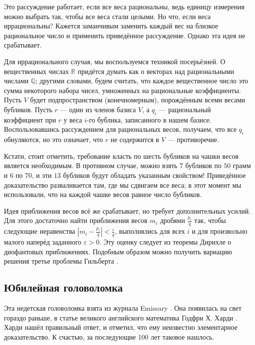 Это рассуждение работает, если все веса рациональны, ведь единицу измерения можно выбрать так, чтобы все веса стали целыми.
Но что, если веса иррациональны?
Кажется заманчивым заменить каждый вес на близкое рациональное число и применить приведённое рассуждение.
Однако эта идея не срабатывает.

Для иррационального случая, мы воспользуемся техникой посерьёзней.
О вещественных числах $\mathbb{R}$ придётся думать как о векторах над рациональными числами $\mathbb{Q}$;
другими словами, будем считать, что каждое вещественное число это сумма некоторого набора чисел, умноженных на рациональные коэффициенты.
Пусть $V$ будет подпространством (конечномерным), порождённым всеми весами бубликов.
Пусть $r$ --- один из членов базиса $V$, а $q_i$ --- рациональный коэффициент при $r$ у веса $i$-го бублика, записанного в нашем базисе.
Воспользовавшись рассуждением для рациональных весов, получаем, что все $q_i$ обнуляются, но это означает, что $r$ не содержится в $V$ --- противоречие.

Кстати, стоит отметить, требование класть по шесть бубликов на чашки весов является необходимым.
В противном случае, можно взять $7$ бубликов по $50$ грамм и $6$ по $70$, и эти $13$ бубликов будут обладать указанным свойством!
Приведённое доказательство разваливается там, где мы сдвигаем все веса;
в этот момент мы использовали, что на каждой чашке весов равное число бубликов.

\begin{addedbytheeditors}
Идея приближения весов всё же срабатывает, но требует дополнительных усилий.
Для этого достаточно найти приближения весов $m_i$ дробями $\tfrac{p_i}q$ так, чтобы следующие неравенства
$|m_i-\tfrac{p_i}q|<\tfrac\varepsilon q$,
выполнялись для всех $i$ и для произвольно малого наперёд заданного $\varepsilon>0$.
Эту оценку следует из теоремы Дирихле о диофантовых приближениях.
Подобным образом можно получить вариацию решения третье проблемы Гильберта \cite[Lemma 1]{benko}. 
\end{addedbytheeditors}


\subsection*{Юбилейная головоломка}

Эта недетская головоломка взята из журнала Emissary \cite[Осень 2004]{3}.
Она появилась на свет гораздо раньше, в статье великого английского математика Годфри Х. Харди \cite{37}. 
Харди нашёл правильный ответ, и отметил, что ему неизвестно элементарное доказательство.
К счастью, за последующие 100 лет таковое нашлось.

